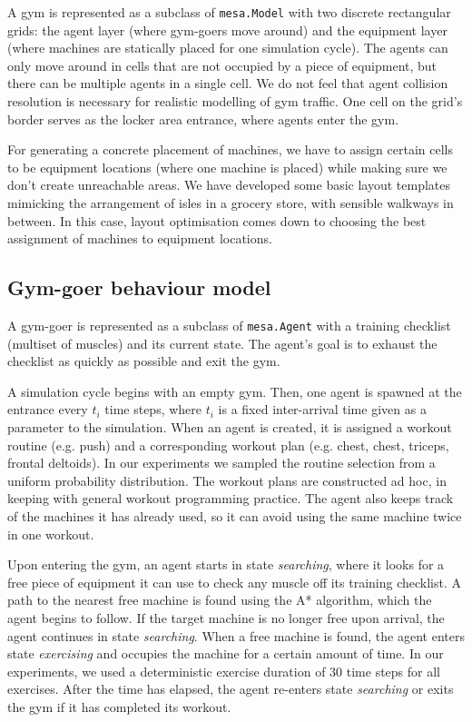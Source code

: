 \documentclass[9pt]{pnas-new}
\begin{document}
A gym is represented as a subclass of \texttt{mesa.Model} with two discrete rectangular grids: the agent layer (where gym-goers move around) and the equipment layer (where machines are statically placed for one simulation cycle). The agents can only move around in cells that are not occupied by a piece of equipment, but there can be multiple agents in a single cell. We do not feel that agent collision resolution is necessary for realistic modelling of gym traffic. 
One cell on the grid's border serves as the locker area entrance, where agents enter the gym.

For generating a concrete placement of machines, we have to assign certain cells to be equipment locations (where one machine is placed) while making sure we don't create unreachable areas. We have developed some basic layout templates mimicking the arrangement of isles in a grocery store, with sensible walkways in between. In this case, layout optimisation comes down to choosing the best assignment of machines to equipment locations.

\subsection*{Gym-goer behaviour model}

A gym-goer is represented as a subclass of \texttt{mesa.Agent} with a training checklist (multiset of muscles) and its current state.  The agent's goal is to exhaust the checklist as quickly as possible and exit the gym.

A simulation cycle begins with an empty gym. Then, one agent is spawned at the entrance every $t_i$ time steps,
where $t_i$ is a fixed inter-arrival time given as a parameter to the simulation.
When an agent is created, it is assigned a workout routine (e.g. push) and a corresponding workout plan (e.g. chest, chest, triceps, frontal deltoids).
In our experiments we sampled the routine selection from a uniform probability distribution.
The workout plans are constructed ad hoc, in keeping with general workout programming practice.
The agent also keeps track of the machines it has already used, so it can avoid using the same machine twice in one workout.

Upon entering the gym, an agent starts in state {\it searching}, where it looks for a free piece of equipment it can use to check any muscle off its training checklist. A path to the nearest free machine is found using the A* algorithm, which the agent begins to follow.
If the target machine is no longer free upon arrival, the agent continues in state {\it searching}.
When a free machine is found, the agent enters state {\it exercising} and occupies the machine for a certain amount of time. In our experiments, we used a deterministic exercise duration of 30 time steps for all exercises.
After the time has elapsed, the agent re-enters state {\it searching} or exits the gym if it has completed its workout.
\end{document}
